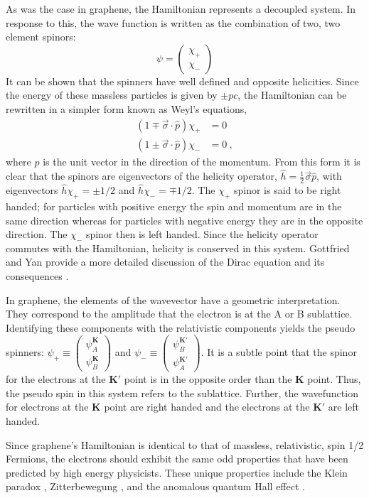 As was the case in graphene, the Hamiltonian represents a decoupled system.
In response to this, the wave function is written as the combination of two, two element spinors:
\begin{equation*}
	\psi=\left( \begin{array}{c} \chi_{+} \\ \chi_{-} \end{array} \right)
\end{equation*}
It can be shown that the spinners have well defined and opposite helicities.
Since the energy of these massless particles is given by $\pm p c$, the Hamiltonian can be rewritten in a simpler form known as Weyl's equations,
\begin{align*}
	(1 \mp \vec{\sigma} \cdot \hat{p}) \chi_{+}&=0 \\
	(1 \pm \vec{\sigma} \cdot \hat{p}) \chi_{-}&=0 \ ,
\end{align*}
where $\hat{p}$ is the unit vector in the direction of the momentum.
From this form it is clear that the spinors are eigenvectors of the helicity operator, $\hat{h}=\frac{1}{2} \vec{\sigma} \hat{p}$, with eigenvectors $\hat{h} \chi_+=\pm 1/2$ and $\hat{h} \chi_-=\mp 1/2$.
The $\chi_+$ spinor is said to be right handed; for particles with positive energy the spin and momentum are in the same direction whereas for particles with negative energy they are in the opposite direction.
The $\chi_-$ spinor then is left handed.
Since the helicity operator commutes with the Hamiltonian, helicity is conserved in this system.
Gottfried and Yan provide a more detailed discussion of the Dirac equation and its consequences \cite{Gottfried2003}.

In graphene, the elements of the wavevector have a geometric interpretation.
They correspond to the amplitude that the electron is at the A or B sublattice.
Identifying these components with the relativistic components yields the pseudo spinners: $\psi_+ \equiv \left(\begin{array}{c} \psi_A^{\bm{K}} \\ \psi_B^{\bm{K}} \end{array} \right)$ and $\psi_- \equiv \left(\begin{array}{c} \psi_B^{\bm{K'}} \\ \psi_A^{\bm{K'}} \end{array} \right)$.
It is a subtle point that the spinor for the electrons at the $\bm{K'}$ point is in the opposite order than the $\bm{K}$ point.
Thus, the pseudo spin in this system refers to the sublattice.
Further, the wavefunction for electrons at the $\bm{K}$ point are right handed and the electrons at the $\bm{K'}$ are left handed.

Since graphene's Hamiltonian is identical to that of massless, relativistic, spin 1/2 Fermions, the electrons should exhibit the same odd properties that have been predicted by high energy physicists.
These unique properties include the Klein paradox \cite{Young2009}, Zitterbewegung \cite{CastroNeto2009}, and the anomalous quantum Hall effect \cite{Novoselov2005a,Zhang2005}.